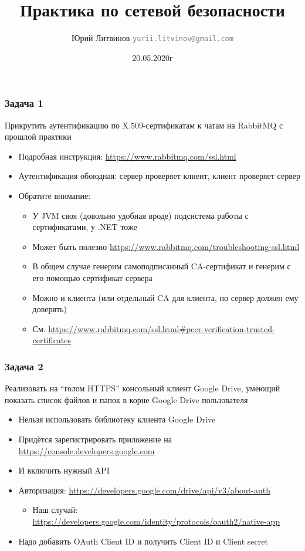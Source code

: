 \documentclass[xetex,mathserif,serif]{beamer}
\title{Практика по сетевой безопасности}
\author[Юрий Литвинов]{Юрий Литвинов \newline \textcolor{gray}{\small\texttt{yurii.litvinov@gmail.com}}}
\date{20.05.2020г}
\begin{document}
    \frame{\titlepage}

    \begin{frame}
        \frametitle{Задача 1}
        \begin{footnotesize}
            Прикрутить аутентификацию по X.509-сертификатам к чатам на RabbitMQ с прошлой практики
            \begin{itemize}
                \item Подробная инструкция: \url{https://www.rabbitmq.com/ssl.html}
                \item Аутентификация обоюдная: сервер проверяет клиент, клиент проверяет сервер
                \item Обратите внимание:
                \begin{itemize}
                    \item У JVM своя (довольно удобная вроде) подсистема работы с сертификатами, у .NET тоже
                    \item Может быть полезно \url{https://www.rabbitmq.com/troubleshooting-ssl.html}
                    \item В общем случае генерим самоподписанный CA-сертификат и генерим с его помощью сертификат сервера
                    \item Можно и клиента (или отдельный CA для клиента, но сервер должен ему доверять)
                    \item См. \url{https://www.rabbitmq.com/ssl.html\#peer-verification-trusted-certificates}
                \end{itemize}
            \end{itemize}
        \end{footnotesize}
    \end{frame}

    \begin{frame}
        \frametitle{Задача 2}
        Реализовать на ``голом HTTPS'' консольный клиент Google Drive, умеющий показать список файлов и папок в корне Google Drive пользователя
        \begin{itemize}
            \item Нельзя использовать библиотеку клиента Google Drive
            \item Придётся зарегистрировать приложение на \url{https://console.developers.google.com}
            \item И включить нужный API
            \item Авторизация: \url{https://developers.google.com/drive/api/v3/about-auth}
            \begin{itemize}
                \item Наш случай: \url{https://developers.google.com/identity/protocols/oauth2/native-app}
            \end{itemize}
            \item Надо добавить OAuth Client ID и получить Client ID и Client secret
        \end{itemize}
    \end{frame}
\end{document}
